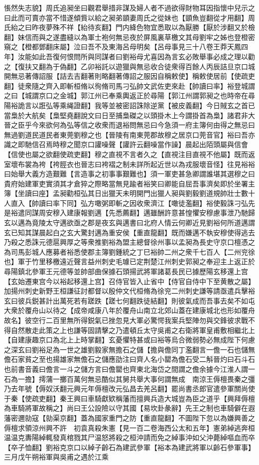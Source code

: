 悵然失志貌】周氏追昶坐曰觀君舉措非謀及婦人者不過欲得財物耳因指懷中兒示之曰此而可賣亦當不惜遂傾貲以給之昶弟顗妻周氏之從妹也【顗魚豈翻從才用翻】周氏紿之曰昨夜夢殊不祥【紿待亥翻】門内絳色物宜悉取以為厭勝【厭於涉翻又於檢翻】妹信而與之遂盡縫以為軍士袍何無忌夜於屏風裏草檄文其母劉牢之姊也登橙密窺之【橙都鄧翻床屬】泣曰吾不及東海呂母明矣【呂母事見三十八卷王莽天鳳四年】汝能如此吾復何恨問所與同謀者曰劉裕母尤喜因為言玄必敗舉事必成之理以勸之【復扶又翻為于偽翻】乙卯裕託以遊獵與無忌收合徒衆得百餘人丙辰詰旦京口城開無忌著傳詔服【詰去吉翻著則略翻著傳詔之服因自稱敕使】稱敕使居前【使疏吏翻】徒衆隨之齊入即斬桓脩以徇脩司馬刁弘帥文武佐吏來赴【帥讀曰率】裕登城謂之曰【城謂京口之金城】郭江州已奉乘輿返正於尋陽【郭江州謂郭昶之也時帝在尋陽裕詭言以誑弘等乘䋲證翻】我等並被密詔誅除逆黨【被皮義翻】今日賊玄之首已當梟於大航矣【梟堅堯翻說文曰日至捕梟磔之以頭掛木上今謂掛首為梟】諸君非大晉之臣乎今來欲何為弘等信之收衆而退裕問無忌曰今急須一府主簿何由得之無忌曰無過劉道民道民者東莞劉穆之也【晉陵有南東莞郡故穆之居京口莞音官】裕曰吾亦識之即馳信召焉時穆之聞京口讙噪聲【讙許云翻噪當作譟】晨起出陌頭屬與信會【信使也屬之欲翻使疏吏翻】穆之直視不言者久之【直視注目直視不他屬】既而返室壞布裳為袴【袴脛衣也晉志曰袴褶之制未詳所起近世以為戎服壞音怪】往見裕裕曰始舉大義方造艱難【言造事之初事事艱難也】須一軍吏甚急卿謂誰堪其選穆之曰貴府始建軍吏實須其才倉猝之際略當無見踰者裕笑曰卿能自屈吾事濟矣即於坐署主簿【坐讀曰座】孟昶勸桓弘其日出獵天未明開門出獵人昶與劉毅劉道規帥壯士數十人直入【帥讀曰率下同】弘方噉粥即斬之因收衆濟江【噉徒濫翻】裕使毅誅刁弘先是裕遣同謀周安穆入建康報劉邁【先悉薦翻】邁雖酬許意甚惶懼安穆慮事泄乃馳歸玄以邁為竟陵太守邁欲亟之郡是夜玄與邁書曰北府人情云何卿近見劉裕何所道邁謂玄已知其謀晨起白之玄大驚封邁為重安侯【重直龍翻】既而嫌邁不執安穆使得逃去乃殺之悉誅元德扈興厚之等衆推劉裕為盟主總督徐州事以孟昶為長史守京口檀憑之為司馬彭城人應募者裕悉使郡主簿劉鍾統之丁巳裕帥二州之衆千七百人【二州兖徐也】軍于竹里移檄遠近聲言益州刺史毛璩已定荆楚江州刺史郭昶之奉迎主上返正於尋陽鎮北參軍王元德等並帥部曲保據石頭揚武將軍諸葛長民已據歷陽玄移還上宫【玄始遷東宫今以裕起移還上宫】召侍官皆入止省中【侍官自侍中下至黄散之屬】加揚州刺史新野王桓謙征討都督以殷仲文代桓脩為徐兖二州刺史謙等請亟遣兵擊裕玄曰彼兵鋭甚計出萬死若有蹉跌【蹉七何翻跌徒結翻】則彼氣成而吾事去矣不如屯大衆於覆舟山以待之【成帝咸康八年於覆舟山南立北郊山蓋在建康城北也形如覆舟故名】彼空行二百里無所得鋭氣已挫忽見大軍必驚愕我案兵堅陣勿與交鋒彼求戰不得自然散走此策之上也謙等固請擊之乃遣頓丘太守吳甫之右衛將軍皇甫敷相繼北上【自建康趣京口為北上上時掌翻】玄憂懼特甚或曰裕等烏合微弱勢必無成陛下何慮之深玄曰劉裕足為一世之雄劉毅家無擔石之儲【擔與儋同丁濫翻言一儋一石也儲無儋石家貧之至也揚雄家無儋石之儲應劭注曰齊人名小罌為儋石受二斛晉灼曰石斗石也前書音義曰儋言一斗之儲方言曰儋罌也齊東北海岱之間謂之儋余據今江淮人謂一石為一擔】摴蒲一擲百萬何無忌酷似其舅共舉大事何謂無成　南涼王傉檀畏秦之彊乃去年號【傉奴沃翻元興元年傉檀改元弘昌去羌呂翻】罷尚書丞郎官遣參軍關尚使于秦【使疏吏翻】秦王興曰車騎獻欵稱藩而擅興兵造大城豈為臣之道乎【興拜傉檀為車騎將軍故稱之】尚曰王公設險以守其國【易坎卦彖辭】先王之制也車騎僻在遐藩密邇勍寇【勍渠京翻】蓋為國家重門之防【重直龍翻】不圖陛下忽以為嫌興善之傉檀求領涼州興不許　初袁真殺朱憲【見一百二卷海西公太和五年】憲弟綽逃奔桓温温克夀陽綽輒發真棺戮其尸温怒將殺之桓沖請而免之綽事沖如父沖薨綽嘔血而卒【卒子恤翻】劉裕克京口以綽子齡石為建武參軍【裕本為建武將軍以齡石參軍事】三月戊午朔裕軍與吳甫之遇於江乘